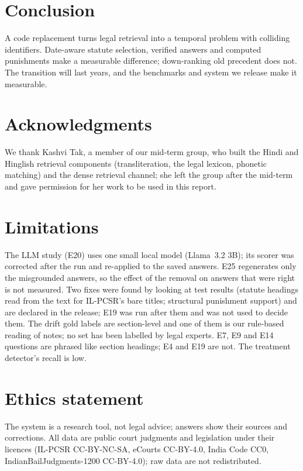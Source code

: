 \documentclass[11pt]{article}
\begin{document}
\section{Conclusion}
A code replacement turns legal retrieval into a temporal problem with colliding identifiers.
Date-aware statute selection, verified answers and computed punishments make a measurable
difference; down-ranking old precedent does not. The transition will last years, and the
benchmarks and system we release make it measurable.

\section*{Acknowledgments}
We thank Kashvi Tak, a member of our mid-term group, who built the Hindi and Hinglish retrieval components (transliteration, the legal lexicon, phonetic matching) and the dense retrieval channel; she left the group after the mid-term and gave permission for her work to be used in this report.

\section*{Limitations}
The LLM study (E20) uses one small local model (Llama~3.2 3B); its scorer was corrected after the
run and re-applied to the saved answers. E25 regenerates only the misgrounded answers, so
the effect of the removal on answers that were right is not measured. Two fixes were found by looking at test results (statute
headings read from the text for IL-PCSR's bare titles; structural punishment support) and are
declared in the release; E19 was run after them and was not used to decide them. The drift gold
labels are section-level and one of them is our rule-based reading of notes; no set has been
labelled by legal experts. E7, E9 and E14 questions are phrased like section headings;
E4 and E19 are not. The treatment detector's recall is low.

\section*{Ethics statement}
The system is a research tool, not legal advice; answers show their sources and corrections. All
data are public court judgments and legislation under their licences (IL-PCSR CC-BY-NC-SA,
eCourts CC-BY-4.0, India Code CC0, IndianBailJudgments-1200 CC-BY-4.0); raw data are not
redistributed.


\end{document}
